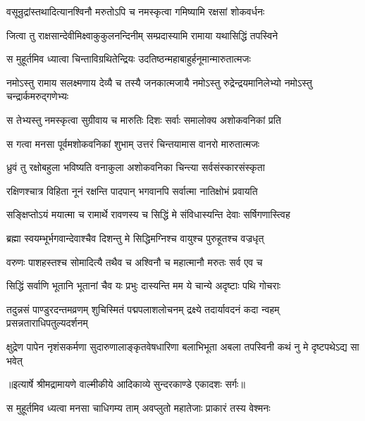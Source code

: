 \twolineshloka
{वसून्रुद्रांस्तथादित्यानश्विनौ मरुतोऽपि च}
{नमस्कृत्वा गमिष्यामि रक्षसां शोकवर्धनः} %

\twolineshloka
{जित्वा तु राक्षसान्देवीमिक्ष्वाकुकुलनन्दिनीम्}
{सम्प्रदास्यामि रामाया यथासिद्धिं तपस्विने} %

\twolineshloka
{स मुहूर्तमिव ध्यात्वा चिन्ताविग्रथितेन्द्रियः}
{उदतिष्ठन्महाबाहुर्हनूमान्मारुतात्मजः} %

\fourlineindentedshloka
{नमोऽस्तु रामाय सलक्ष्मणाय}
{देव्यै च तस्यै जनकात्मजायै}
{नमोऽस्तु रुद्रेन्द्रयमानिलेभ्यो}
{नमोऽस्तु चन्द्रार्कमरुद्गणेभ्यः} %

\twolineshloka
{स तेभ्यस्तु नमस्कृत्वा सुग्रीवाय च मारुतिः}
{दिशः सर्वाः समालोक्य अशोकवनिकां प्रति} %

\twolineshloka
{स गत्वा मनसा पूर्वमशोकवनिकां शुभाम्}
{उत्तरं चिन्तयामास वानरो मारुतात्मजः} %

\twolineshloka
{ध्रुवं तु रक्षोबहुला भविष्यति वनाकुला}
{अशोकवनिका चिन्त्या सर्वसंस्कारसंस्कृता} %

\twolineshloka
{रक्षिणश्चात्र विहिता नूनं रक्षन्ति पादपान्}
{भगवानपि सर्वात्मा नातिक्षोभं प्रवायति} %

\twolineshloka
{सङ्क्षिप्तोऽयं मयात्मा च रामार्थे रावणस्य च}
{सिद्धिं मे संविधास्यन्ति देवाः सर्षिगणास्त्विह} %

\twolineshloka
{ब्रह्मा स्वयम्भूर्भगवान्देवाश्चैव दिशन्तु मे}
{सिद्धिमग्निश्च वायुश्च पुरुहूतश्च वज्रधृत्} %

\twolineshloka
{वरुणः पाशहस्तश्च सोमादित्यै तथैव च}
{अश्विनौ च महात्मानौ मरुतः सर्व एव च} %

\twolineshloka
{सिद्धिं सर्वाणि भूतानि भूतानां चैव यः प्रभुः}
{दास्यन्ति मम ये चान्ये अदृष्टाः पथि गोचराः} %

\fourlineindentedshloka
{तदुन्नसं पाण्डुरदन्तमव्रणम्}
{शुचिस्मितं पद्मपलाशलोचनम्}
{द्रक्ष्ये तदार्यावदनं कदा न्वहम्}
{प्रसन्नताराधिपतुल्यदर्शनम्} %

\fourlineindentedshloka
{क्षुद्रेण पापेन नृशंसकर्मणा}
{सुदारुणालाङ्कृतवेषधारिणा}
{बलाभिभूता अबला तपस्विनी}
{कथं नु मे दृष्टपथेऽद्य सा भवेत्} %


{॥इत्यार्षे श्रीमद्रामायणे वाल्मीकीये आदिकाव्ये सुन्दरकाण्डे एकादशः सर्गः॥}


\twolineshloka
{स मुहूर्तमिव ध्यत्वा मनसा चाधिगम्य ताम्}
{अवप्लुतो महातेजाः प्राकारं तस्य वेश्मनः} %

